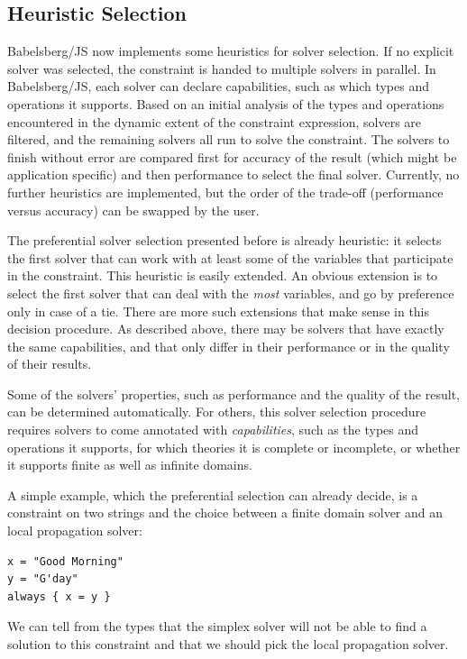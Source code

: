 \documentclass[numbers]{sigplanconf}
\begin{document}
\subsection{Heuristic Selection}
\label{sec:heuristic-solv-select}

Babelsberg/JS now implements some heuristics for solver selection. If no
explicit solver was selected, the constraint is handed to multiple solvers in
parallel. In Babelsberg/JS, each solver can declare capabilities, such as which
types and operations it supports. Based on an initial analysis of the types and
operations encountered in the dynamic extent of the constraint expression,
solvers are filtered, and the remaining solvers all run to solve the
constraint. The solvers to finish without error are compared first for accuracy
of the result (which might be application specific) and then performance to
select the final solver. Currently, no further heuristics are implemented, but
the order of the trade-off (performance versus accuracy) can be swapped by the
user.

The preferential solver selection presented before is already heuristic: it
selects the first solver that can work with at least some of the variables that
participate in the constraint. This heuristic is easily extended. An obvious
extension is to select the first solver that can deal with the \emph{most}
variables, and go by preference only in case of a tie. There are more such
extensions that make sense in this decision procedure. As described above, there
may be solvers that have exactly the same capabilities, and that only differ in
their performance or in the quality of their results.

Some of the solvers' properties, such as performance and the quality of the
result, can be determined automatically. For others, this solver selection
procedure requires solvers to come annotated with \emph{capabilities}, such as
the types and operations it supports, for which theories it is complete or
incomplete, or whether it supports finite as well as infinite domains.

A simple example, which the preferential selection can already decide, is a
constraint on two strings and the choice between a finite domain solver and an
local propagation solver:
\begin{lstlisting}
x = "Good Morning"
y = "G'day"
always { x = y }
\end{lstlisting}
We can tell from the types that the simplex solver will not be able to find a
solution to this constraint and that we should pick the local propagation
solver.
\end{document}
